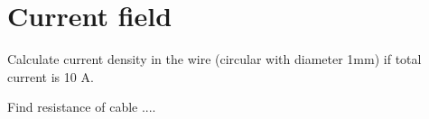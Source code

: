 \section{Current field}

\begin{Exercise}[difficulty=1]
Calculate current density in the wire (circular with diameter 1mm) if total current is 10 A.
\end{Exercise}

\begin{Exercise}[difficulty=1]
Find resistance of cable ....
\end{Exercise}
